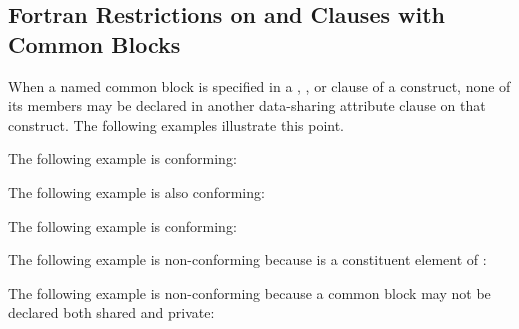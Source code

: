 \begin{fortranspecific}[4ex]
\section{Fortran Restrictions on  and  Clauses with Common Blocks}
\label{sec:fort_sp_common}

When a named common block is specified in a , , 
or  clause of a construct, none of its members may be declared 
in another data-sharing attribute clause on that construct. The following examples 
illustrate this point. 

The following example is conforming:

\pagebreak
{}

The following example is also conforming:


The following example is conforming:


The following example is non-conforming because  is a constituent element 
of :


The following example is non-conforming because a common block may not be declared 
both shared and private:

\end{fortranspecific}


